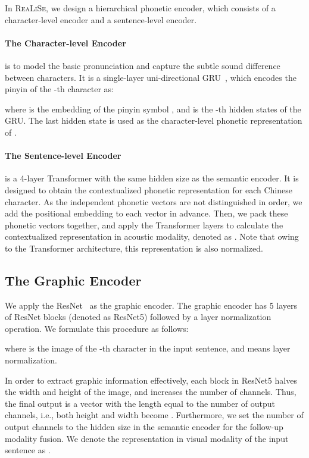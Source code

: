 \documentclass[11pt,a4paper]{article}
\newcommand\model{\textsc{ReaLiSe}}
\begin{document}
In \model{}, we design a hierarchical phonetic encoder, which consists of a character-level encoder and a sentence-level encoder.

\paragraph{The Character-level Encoder} is to model the basic pronunciation and capture the subtle sound difference between characters. It is a single-layer uni-directional GRU~\citep{gru}, which encodes the pinyin of the -th character  as:

where  is the embedding of the pinyin symbol , and  is the -th hidden states of the GRU. The last hidden state is used as the character-level phonetic representation of   . 

\paragraph{The Sentence-level Encoder} is a 4-layer Transformer with the same hidden size as the semantic encoder. It is designed to obtain the contextualized phonetic representation for each Chinese character. As the independent phonetic vectors are not distinguished in order, we add the positional embedding to each vector in advance.
Then, we pack these phonetic vectors together, and apply the Transformer layers to calculate the contextualized representation in acoustic modality, denoted as . Note that owing to the Transformer architecture, this representation is also normalized.

\subsection{The Graphic Encoder}
We apply the ResNet~\citep{resnet} as the graphic encoder.
The graphic encoder has 5 layers of ResNet blocks (denoted as ResNet5) followed by a layer normalization~\cite{layer_norm} operation.
We formulate this procedure as follows:

where  is the image of the -th character  in the input sentence, and  means layer normalization.

In order to extract graphic information effectively, each block in ResNet5 halves the width and height of the image, and increases the number of channels. Thus, the final output is a vector with the length equal to the number of output channels, i.e., both height and width become .
Furthermore, we set the number of output channels to the hidden size in the semantic encoder for the follow-up modality fusion. 
We denote the representation in visual modality of the input sentence as .
\end{document}
